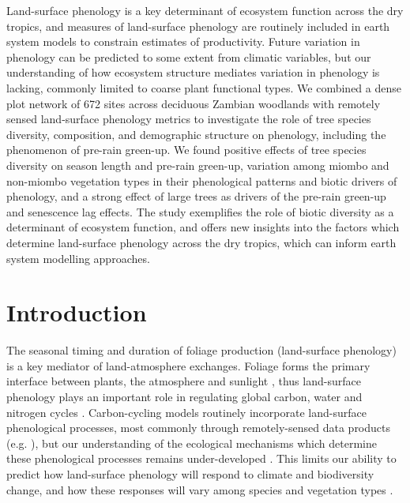 \documentclass[11pt,a4paper]{article}
\begin{document}
Land-surface phenology is a key determinant of ecosystem function across the dry tropics, and measures of land-surface phenology are routinely included in earth system models to constrain estimates of productivity. Future variation in phenology can be predicted to some extent from climatic variables, but our understanding of how ecosystem structure mediates variation in phenology is lacking, commonly limited to coarse plant functional types. We combined a dense plot network of 672 sites across deciduous Zambian woodlands with remotely sensed land-surface phenology metrics to investigate the role of tree species diversity, composition, and demographic structure on phenology, including the phenomenon of pre-rain green-up. We found positive effects of tree species diversity on season length and pre-rain green-up, variation among miombo and non-miombo vegetation types in their phenological patterns and biotic drivers of phenology, and a strong effect of large trees as drivers of the pre-rain green-up and senescence lag effects. The study exemplifies the role of biotic diversity as a determinant of ecosystem function, and offers new insights into the factors which determine land-surface phenology across the dry tropics, which can inform earth system modelling approaches.

\section{Introduction}

The seasonal timing and duration of foliage production (land-surface phenology) is a key mediator of land-atmosphere exchanges. Foliage forms the primary interface between plants, the atmosphere and sunlight \citep{Gu2003, Penuelas2009}, thus land-surface phenology plays an important role in regulating global carbon, water and nitrogen cycles \citep{Richardson2013}. Carbon-cycling models routinely incorporate land-surface phenological processes, most commonly through remotely-sensed data products (e.g. \citealt{Bloom2016}), but our understanding of the ecological mechanisms which determine these phenological processes remains under-developed \citep{Whitley2017}. This limits our ability to predict how land-surface phenology will respond to climate and biodiversity change, and how these responses will vary among species and vegetation types \citep{Xia2015}.
\end{document}
